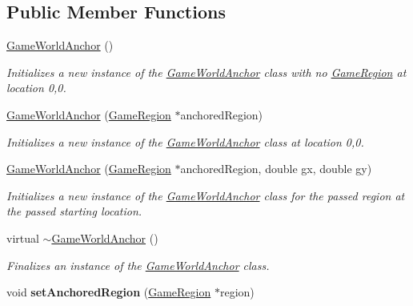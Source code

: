 \subsection*{Public Member Functions}
\begin{DoxyCompactItemize}
\item 
\hyperlink{class_game_world_anchor_a9b0a0ee5f92e6fabee6f6e5adc7001a2}{Game\+World\+Anchor} ()
\begin{DoxyCompactList}\small\item\em Initializes a new instance of the \hyperlink{class_game_world_anchor}{Game\+World\+Anchor} class with no \hyperlink{class_game_region}{Game\+Region} at location 0,0. \end{DoxyCompactList}\item 
\hyperlink{class_game_world_anchor_a65f7f152f39e2bbe2e76e6c7fffaeb93}{Game\+World\+Anchor} (\hyperlink{class_game_region}{Game\+Region} $\ast$anchored\+Region)
\begin{DoxyCompactList}\small\item\em Initializes a new instance of the \hyperlink{class_game_world_anchor}{Game\+World\+Anchor} class at location 0,0. \end{DoxyCompactList}\item 
\hyperlink{class_game_world_anchor_a0c6a75a46de880453962859d3d15e56e}{Game\+World\+Anchor} (\hyperlink{class_game_region}{Game\+Region} $\ast$anchored\+Region, double gx, double gy)
\begin{DoxyCompactList}\small\item\em Initializes a new instance of the \hyperlink{class_game_world_anchor}{Game\+World\+Anchor} class for the passed region at the passed starting location. \end{DoxyCompactList}\item 
virtual \hyperlink{class_game_world_anchor_a364eff1c23a49bbfc050c18efcacc48c}{$\sim$\+Game\+World\+Anchor} ()
\begin{DoxyCompactList}\small\item\em Finalizes an instance of the \hyperlink{class_game_world_anchor}{Game\+World\+Anchor} class. \end{DoxyCompactList}\item 
\mbox{\label{class_game_world_anchor_a9402f4205c4bbd2c62d8f450cf59f178}} 
void {\bfseries set\+Anchored\+Region} (\hyperlink{class_game_region}{Game\+Region} $\ast$region)
\item 
\mbox{\label{class_game_world_anchor_a90f0218771154558ab23d613cc99c2f7}} 

\end{DoxyCompactItemize}
